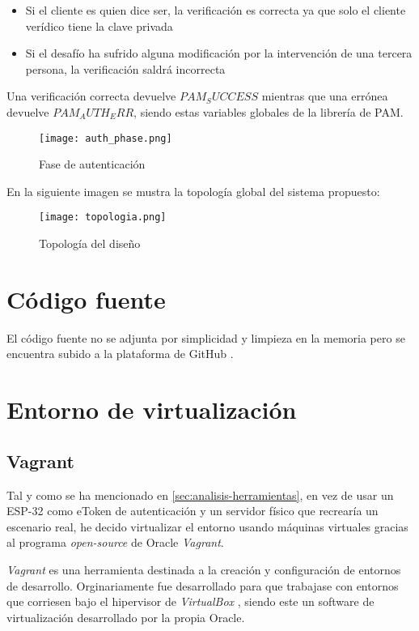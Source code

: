 \begin{itemize}
    \item Si el cliente es quien dice ser, la verificación es correcta ya que solo el cliente verídico tiene la clave privada
    \item Si el desafío ha sufrido alguna modificación por la intervención de una tercera persona, la verificación saldrá incorrecta
\end{itemize}

Una verificación correcta devuelve $PAM_SUCCESS$ mientras que una errónea devuelve $PAM_AUTH_ERR$, siendo estas variables globales
de la librería de PAM.  

\begin{figure}[H]
    \centering
    \texttt{[image: auth\_phase.png]}
    \caption{Fase de autenticación}
\end{figure}

En la siguiente imagen se mustra la topología global del sistema propuesto:

\begin{figure}[H]
    \centering
    \texttt{[image: topologia.png]}
    \caption{Topología del diseño}
\end{figure}

\section{Código fuente}

El código fuente no se adjunta por simplicidad y limpieza en la memoria pero se encuentra subido a la plataforma de GitHub 
\cite{garcia_sergiogp98mqtt-pam_2021}. 

\section{Entorno de virtualización}

\subsection{Vagrant}

Tal y como se ha mencionado en \ref{sec:analisis-herramientas}, en vez de usar un ESP-32 como eToken de autenticación y un servidor 
físico que recrearía un escenario real, he decido virtualizar el entorno usando máquinas virtuales gracias al programa 
\textit{open-source} de Oracle \textit{Vagrant}.

\textit{Vagrant} es una herramienta destinada a la creación y configuración de entornos de desarrollo. Orginariamente fue 
desarrollado para que trabajase con entornos que corriesen bajo el hipervisor de \textit{VirtualBox} \cite{virtualbox}, siendo 
este un software de virtualización desarrollado por la propia Oracle.

